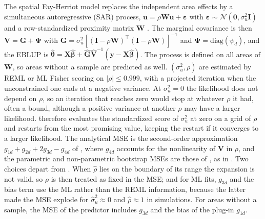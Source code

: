 The spatial Fay-Herriot model replaces the independent area effects by a simultaneous autoregressive (SAR) process, \(\boldsymbol{u} = \rho\boldsymbol{W}\boldsymbol{u} + \boldsymbol{\varepsilon}\) with \(\boldsymbol{\varepsilon} \sim \mathcal{N}(\boldsymbol{0}, \sigma_u^2\boldsymbol{I})\) and a row-standardized proximity matrix \(\boldsymbol{W}\) \citep{petrucci2006small, pratesi2008small}. The marginal covariance is then \(\boldsymbol{V} = \boldsymbol{G} + \boldsymbol{\Psi}\) with \(\boldsymbol{G} = \sigma_u^2[(\boldsymbol{I} - \rho\boldsymbol{W})^\top(\boldsymbol{I} - \rho\boldsymbol{W})]^{-1}\) and \(\boldsymbol{\Psi} = \mathrm{diag}(\psi_d)\), and the EBLUP is \(\hat{\boldsymbol{\theta}} = \boldsymbol{X}\hat{\boldsymbol{\beta}} + \hat{\boldsymbol{G}}\hat{\boldsymbol{V}}^{-1}(\boldsymbol{y} - \boldsymbol{X}\hat{\boldsymbol{\beta}})\). The process is defined on all areas of \(\boldsymbol{W}\), so areas without a sample are predicted as well. \((\sigma_u^2, \rho)\) are estimated by REML or ML Fisher scoring on \(|\rho| \le 0.999\), with a projected iteration when the unconstrained one ends at a negative variance. At \(\sigma_u^2 = 0\) the likelihood does not depend on \(\rho\), so an iteration that reaches zero would stop at whatever \(\rho\) it had, often a bound, although a positive variance at another \(\rho\) may have a larger likelihood.  therefore evaluates the standardized score of \(\sigma_u^2\) at zero on a grid of \(\rho\) and restarts from the most promising value, keeping the restart if it converges to a larger likelihood. The analytical MSE is the second-order approximation \(g_{1d} + g_{2d} + 2g_{3d} - g_{4d}\) of \citet{singh2005spatio}, where \(g_{4d}\) accounts for the nonlinearity of \(\boldsymbol{V}\) in \(\rho\), and the parametric and non-parametric bootstrap MSEs are those of \citet{molina2009bootstrap}, as in  \citep{molina2015sae}. Two choices depart from . When \(\hat{\rho}\) lies on the boundary of its range the expansion is not valid, so \(\rho\) is then treated as fixed in the MSE; and for ML fits, \(g_{3d}\) and the bias term use the ML rather than the REML information, because the latter made the MSE explode for \(\hat{\sigma}_u^2 \approx 0\) and \(\hat{\rho} \approx 1\) in simulations. For areas without a sample, the MSE of the predictor includes \(g_{3d}\) and the bias of the plug-in \(g_{1d}\).

